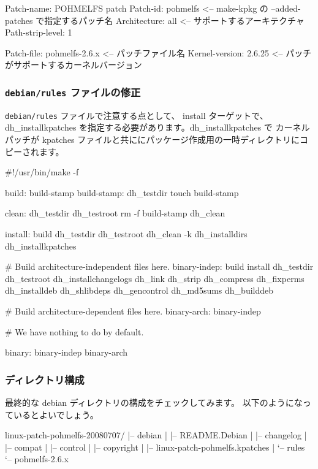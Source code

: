 \documentclass[mingoth,a4paper]{jsarticle}
\begin{document}
\begin{commandline}
Patch-name: POHMELFS patch
Patch-id: pohmelfs <-- make-kpkg の --added-patches で指定するパッチ名 
Architecture: all <-- サポートするアーキテクチャ
Path-strip-level: 1

Patch-file: pohmelfs-2.6.x <-- パッチファイル名
Kernel-version: 2.6.25 <-- パッチがサポートするカーネルバージョン
\end{commandline}

\subsubsection{\texttt{debian/rules} ファイルの修正}
\texttt{debian/rules} ファイルで注意する点として、 install ターゲットで、
dh\_installkpatches を指定する必要があります。dh\_installkpatches で
カーネルパッチが kpatches ファイルと共ににパッケージ作成用の一時ディレクトリにコピーされます。

\begin{commandline}
#!/usr/bin/make -f

build: build-stamp
build-stamp:
        dh_testdir
        touch build-stamp

clean:
        dh_testdir
        dh_testroot
        rm -f build-stamp
        dh_clean

install: build
        dh_testdir
        dh_testroot
        dh_clean -k
        dh_installdirs
        dh_installkpatches

# Build architecture-independent files here.
binary-indep: build install
        dh_testdir
        dh_testroot
        dh_installchangelogs
        dh_link
        dh_strip
        dh_compress
        dh_fixperms
        dh_installdeb
        dh_shlibdeps
        dh_gencontrol
        dh_md5sums
        dh_builddeb

# Build architecture-dependent files here.
binary-arch: binary-indep

# We have nothing to do by default.

binary: binary-indep binary-arch
\end{commandline}

\subsubsection{ディレクトリ構成}
最終的な debian ディレクトリの構成をチェックしてみます。
以下のようになっているとよいでしょう。
\begin{commandline}
linux-patch-pohmelfs-20080707/
|-- debian
|   |-- README.Debian
|   |-- changelog
|   |-- compat
|   |-- control
|   |-- copyright
|   |-- linux-patch-pohmelfs.kpatches
|   `-- rules
`-- pohmelfs-2.6.x
\end{commandline}
\end{document}

